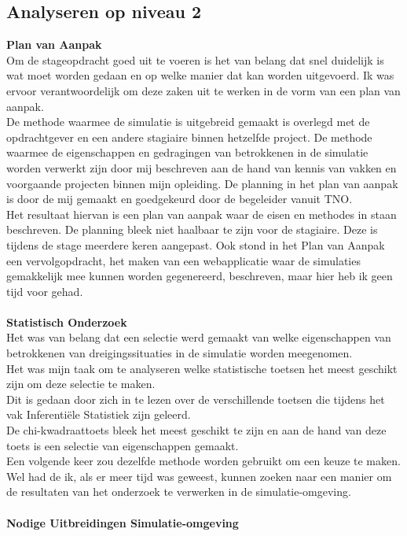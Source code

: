 \documentclass[12pt, letterpaper]{article}
\begin{document}
\begin{appendices}
\subsection{Analyseren op niveau 2}
\textbf{Plan van Aanpak}\\
Om de stageopdracht goed uit te voeren is het van belang dat snel duidelijk is wat moet worden gedaan en op welke manier dat kan worden uitgevoerd.
Ik was ervoor verantwoordelijk om deze zaken uit te werken in de vorm van een plan van aanpak.\\
De methode waarmee de simulatie is uitgebreid gemaakt is overlegd met de opdrachtgever en een andere stagiaire binnen hetzelfde project. De methode waarmee de eigenschappen en gedragingen van betrokkenen in de simulatie worden verwerkt zijn door mij beschreven aan de hand van kennis van vakken en voorgaande projecten binnen mijn opleiding. De planning in het plan van aanpak is door de mij gemaakt en goedgekeurd door de begeleider vanuit TNO.\\
Het resultaat hiervan is een plan van aanpak waar de eisen en methodes in staan beschreven.
De planning bleek niet haalbaar te zijn voor de stagiaire. Deze is tijdens de stage meerdere keren aangepast. Ook stond in het Plan van Aanpak een vervolgopdracht, het maken van een webapplicatie waar de simulaties gemakkelijk mee kunnen worden gegenereerd, beschreven, maar hier heb ik geen tijd voor gehad.\\
\\
\textbf{Statistisch Onderzoek}\\
Het was van belang dat een selectie werd gemaakt van welke eigenschappen van betrokkenen van dreigingssituaties in de simulatie worden meegenomen.\\
Het was mijn taak om te analyseren welke statistische toetsen het meest geschikt zijn om deze selectie te maken.\\
Dit is gedaan door zich in te lezen over de verschillende toetsen die tijdens het vak Inferentiële Statistiek zijn geleerd.\\
De chi-kwadraattoets bleek het meest geschikt te zijn en aan de hand van deze toets is een selectie van eigenschappen gemaakt.\\
Een volgende keer zou dezelfde methode worden gebruikt om een keuze te maken. Wel had de ik, als er meer tijd was geweest, kunnen zoeken naar een manier om de resultaten van het onderzoek te verwerken in de simulatie-omgeving. \\
\\
\textbf{Nodige Uitbreidingen Simulatie-omgeving}\\

\end{appendices}
\end{document}

